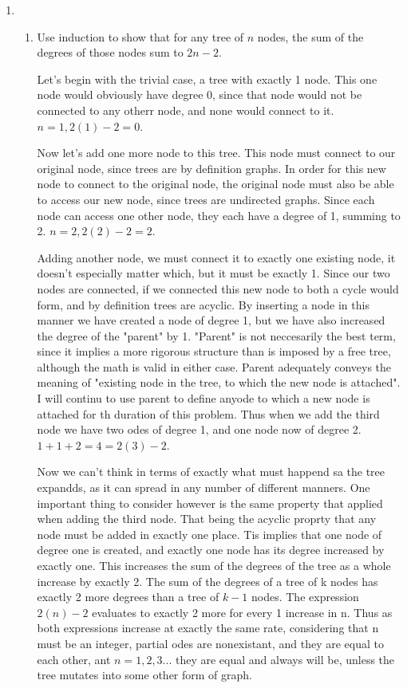 \documentclass[11pt]{article}
\begin{document}
\begin{enumerate}[1.]

\item 

\begin{enumerate}
\item Use induction to show that for any tree of $n$ nodes, the sum of the degrees of those nodes sum to $2n-2$.

	Let's begin with the trivial case, a tree with exactly 1 node.  This one node would obviously have degree 0, since that node would not be connected to any otherr node, and none would connect to it. $n=1, 2(1)-2=0$.

	Now let's add  one more node to this tree.  This node must connect to our original node, since trees are by definition graphs.  In order for this new node to connect to the original node, the original node must also be able to access our new node, since trees are undirected graphs.  Since each node can access one other node, they each have a degree of 1, summing to 2. $n=2, 2(2)-2=2$.

	Adding another node, we must connect it to exactly one existing node, it doesn't especially matter which, but it must be exactly 1.  Since our two nodes are connected, if we connected this new node to both a cycle would form, and by definition trees are acyclic. By inserting a node in this manner we have created a node of degree 1, but we have also increased the degree of the "parent" by 1.  "Parent" is not neccesarily the best term, since it implies a more rigorous structure than is imposed by a free tree, although the math is valid in either case. Parent adequately conveys the meaning of "existing node in the tree, to which the new node is attached".  I will continu to use parent to define anyode to which a new node is attached for th duration of this problem.  Thus when we add the third node we have two odes of degree 1, and one node now of degree 2.  $1+1+2=4=2(3)-2$.

	Now we can't think in terms of exactly what must happend sa the tree expandds, as it can spread in any number of different manners.  One important thing to consider however is the same property that applied when adding the third node.  That being the acyclic proprty that any node must be added in exactly one place.  Tis implies that one node of degree one is created, and exactly one node has its degree increased by exactly one.  This increases the sum of the degrees of the tree as a whole increase by exactly 2.  The sum of the degrees of a tree of k nodes has exactly 2 more degrees than a tree of $k-1$ nodes. The expression $2(n)-2$ evaluates to exactly 2 more for every 1 increase in n.  Thus as both expressions increase at exactly the same rate, considering that n must be an integer, partial odes are nonexistant, and they are equal to each other, ant $n=1,2,3...$ they are equal and always will be, unless the tree mutates into some other form of graph.



\end{enumerate}
\end{enumerate}
\end{document}
